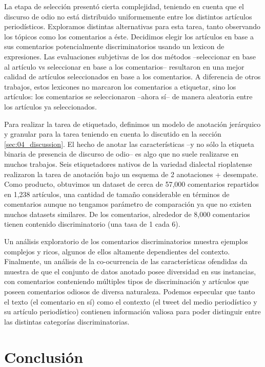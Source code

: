 La etapa de selección presentó cierta complejidad, teniendo en cuenta que el discurso de odio no está distribuido uniformemente entre los distintos artículos periodísticos. Exploramos distintas alternativas para esta tarea, tanto observando los tópicos como los comentarios a éste. Decidimos elegir los artículos en base a sus comentarios potencialmente discriminatorios usando un lexicon de expresiones. Las evaluaciones subjetivas de los dos métodos --seleccionar en base al artículo vs seleccionar en base a los comentarios-- resultaron en una mejor calidad de artículos seleccionados en base a los comentarios. A diferencia de otros trabajos, estos lexicones no marcaron los comentarios a etiquetar, sino los artículos: los comentarios se seleccionaron --ahora sí-- de manera aleatoria entre los artículos ya seleccionados.


Para realizar la tarea de etiquetado, definimos un modelo de anotación jerárquico y granular para la tarea teniendo en cuenta lo discutido en la sección \ref{sec:04_discussion}. El hecho de anotar las características --y no sólo la etiqueta binaria de presencia de discurso de odio-- es algo que no suele realizarse en muchos trabajos. Seis etiquetadores nativos de la variedad dialectal rioplatense realizaron la tarea de anotación bajo un esquema de 2 anotaciones + desempate. Como producto, obtuvimos un dataset de cerca de 57,000 comentarios repartidos en 1,238 artículos, una cantidad de tamaño considerable en términos de comentarios aunque no tengamos parámetro de comparación ya que no existen muchos datasets similares. De los comentarios, alrededor de 8,000 comentarios tienen contenido discriminatorio (una tasa de 1 cada 6).


Un análisis exploratorio de los comentarios discriminatorios muestra ejemplos complejos y ricos, algunos de ellos altamente dependientes del contexto. Finalmente, un análisis de la co-ocurrencia de las características ofendidas da muestra de que el conjunto de datos anotado posee diversidad en sus instancias, con comentarios conteniendo múltiples tipos de discriminación y artículos que poseen comentarios odiosos de diversa naturaleza. Podemos especular que tanto el texto (el comentario en sí) como el contexto (el tweet del medio periodístico y su artículo periodístico) contienen información valiosa para poder distinguir entre las distintas categorías discriminatorias.


\section{Conclusión}


